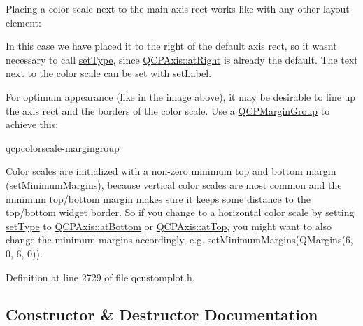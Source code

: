 Placing a color scale next to the main axis rect works like with any other layout element\+: 
\begin{DoxyCodeInclude}
\end{DoxyCodeInclude}
In this case we have placed it to the right of the default axis rect, so it wasn\textquotesingle{}t necessary to call \hyperlink{class_q_c_p_color_scale_a1bf9bdb291927c422dd66b404b206f1f}{set\+Type}, since \hyperlink{class_q_c_p_axis_ae2bcc1728b382f10f064612b368bc18aadf5509f7d29199ef2f263b1dd224b345}{Q\+C\+P\+Axis\+::at\+Right} is already the default. The text next to the color scale can be set with \hyperlink{class_q_c_p_color_scale_aee124ae8396320cacf8276e9a0fbb8ce}{set\+Label}.

For optimum appearance (like in the image above), it may be desirable to line up the axis rect and the borders of the color scale. Use a \hyperlink{class_q_c_p_margin_group}{Q\+C\+P\+Margin\+Group} to achieve this\+: 
\begin{DoxyCodeInclude}
\end{DoxyCodeInclude}
qcpcolorscale-\/margingroup

Color scales are initialized with a non-\/zero minimum top and bottom margin (\hyperlink{class_q_c_p_layout_element_a0a8a17abc16b7923159fcc7608f94673}{set\+Minimum\+Margins}), because vertical color scales are most common and the minimum top/bottom margin makes sure it keeps some distance to the top/bottom widget border. So if you change to a horizontal color scale by setting \hyperlink{class_q_c_p_color_scale_a1bf9bdb291927c422dd66b404b206f1f}{set\+Type} to \hyperlink{class_q_c_p_axis_ae2bcc1728b382f10f064612b368bc18aa220d68888516b6c3b493d144f1ba438f}{Q\+C\+P\+Axis\+::at\+Bottom} or \hyperlink{class_q_c_p_axis_ae2bcc1728b382f10f064612b368bc18aac0ece2b680d3f545e701f75af1655977}{Q\+C\+P\+Axis\+::at\+Top}, you might want to also change the minimum margins accordingly, e.\+g. {\ttfamily set\+Minimum\+Margins(\+Q\+Margins(6, 0, 6, 0))}. 

Definition at line 2729 of file qcustomplot.\+h.



\subsection{Constructor \& Destructor Documentation}
\hypertarget{class_q_c_p_color_scale_aa8debce1be38b54287c04d4f584394b4}{}
